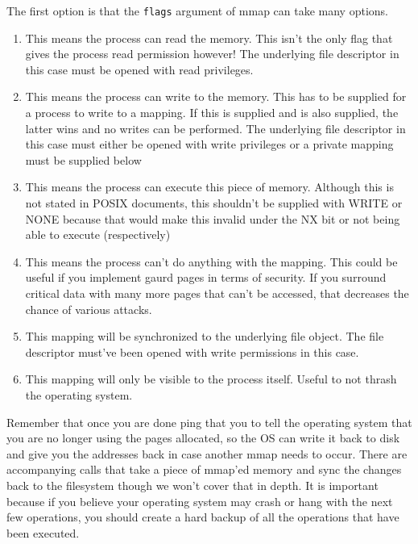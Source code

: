 The first option is that the \texttt{flags} argument of mmap can take many options.

\begin{enumerate}
\item {} This means the process can read the memory. This isn't the only flag that gives the process read permission however! The underlying file descriptor in this case must be opened with read privileges.
\item {} This means the process can write to the memory. This has to be supplied for a process to write to a mapping. If this is supplied and  is also supplied, the latter wins and no writes can be performed. The underlying file descriptor in this case must either be opened with write privileges or a private mapping must be supplied below
\item {} This means the process can execute this piece of memory. Although this is not stated in POSIX documents, this shouldn't be supplied with WRITE or NONE because that would make this invalid under the NX bit or not being able to execute (respectively)
\item {} This means the process can't do anything with the mapping. This could be useful if you implement gaurd pages in terms of security. If you surround critical data with many more pages that can't be accessed, that decreases the chance of various attacks.
\item {} This mapping will be synchronized to the underlying file object. The file descriptor must've been opened with write permissions in this case.
\item {} This mapping will only be visible to the process itself. Useful to not thrash the operating system.
\end{enumerate}

Remember that once you are done ping that you  to tell the operating system that you are no longer using the pages allocated, so the OS can write it back to disk and give you the addresses back in case another mmap needs to occur.
There are accompanying calls  that take a piece of mmap'ed memory and sync the changes back to the filesystem though we won't cover that in depth. It is important because if you believe your operating system may crash or hang with the next few operations, you should create a hard backup of all the operations that have been executed.


